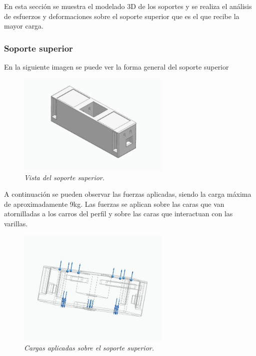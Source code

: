 En esta sección se muestra el modelado 3D de los soportes y se realiza el análisis de esfuerzos y deformaciones sobre el soporte superior que es el que recibe la mayor carga.
\subsubsection{Soporte superior}
En la siguiente imagen se puede ver la forma general del soporte superior
\begin{figure}[H]
    \centering
        \includegraphics[width=0.65\textwidth]{img/SuperiorReal_simplificado_vista.jpg}
        \caption{\textit{Vista del soporte superior.}}
        \label{fig:SuperiorReal_simplificado_vista}
\end{figure}
A continuación se pueden observar las fuerzas aplicadas, siendo la carga máxima de aproximadamente 9kg. Las fuerzas se aplican sobre las caras que van atornilladas a los carros del perfil y sobre las caras que interactuan con las varillas.
\begin{figure}[H]
    \centering
        \includegraphics[width=0.65\textwidth]{img/SuperiorReal_simplificado_fuerzas_app.jpg}
        \caption{\textit{Cargas aplicadas sobre el soporte superior.}}
        \label{fig:SuperiorReal_simplificado_fuerzas_app}
\end{figure}

